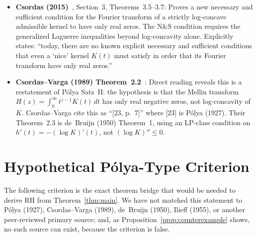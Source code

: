 \documentclass[11pt]{article}
\theoremstyle{definition}
\theoremstyle{remark}
\begin{document}
\begin{itemize}
  zbMATH review (Zbl~1278.30028) explicitly flags as an \textbf{Open Problem}:
  whether a log-concave admissible kernel's moment sequence satisfies the
  Tur\'{a}n inequalities (a necessary condition for only real zeros of the Fourier
  transform).
\item \textbf{Csordas (2015)}~\cite{csordas2015}, Section~3, Theorems~3.5--3.7:
  Proves a new necessary and sufficient condition for the Fourier transform of a
  strictly log-concave admissible kernel to have only real zeros.
  The N\&S condition requires the generalized Laguerre inequalities beyond
  log-concavity alone.
  Explicitly states: ``today, there are no known explicit necessary and sufficient
  conditions that even a `nice' kernel $K(t)$ must satisfy in order that its Fourier
  transform have only real zeros.''
\item \textbf{Csordas--Varga (1989) Theorem~2.2}~\cite{csordas1989}:
  Direct reading reveals this is a restatement of P\'{o}lya Satz~II:
  the hypothesis is that the Mellin transform
  $H(z)=\int_0^\infty t^{z-1}K(t)\,dt$ has only real negative zeros, not
  log-concavity of~$K$.
  Csordas--Varga cite this as ``[23, p.~7]'' where [23] is P\'{o}lya (1927).
  Their Theorem~2.3 is de~Bruijn (1950) Theorem~1, using an LP-class
  condition on $h'(t)=-(\log K)'(t)$, not $(\log K)''\leq 0$.
\end{itemize}

\section{Hypothetical P\'{o}lya-Type Criterion}
\label{sec:polya}

The following criterion is the exact theorem bridge that would be needed to derive RH
from Theorem~\ref{thm:main}.
We have not matched this statement to P\'{o}lya (1927), Csordas--Varga (1989),
de~Bruijn (1950), Ilieff (1955), or another peer-reviewed primary source;
and, as Proposition~\ref{prop:counterexample} shows, no such source can
exist, because the criterion is false.
\end{document}
